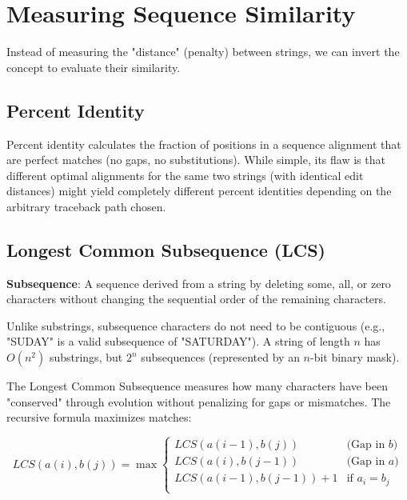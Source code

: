 \section{Measuring Sequence Similarity}

Instead of measuring the "distance" (penalty) between strings, we can invert the concept to evaluate their similarity.

\subsection{Percent Identity}
Percent identity calculates the fraction of positions in a sequence alignment that are perfect matches (no gaps, no substitutions).
While simple, its flaw is that different optimal alignments for the same two strings (with identical edit distances) might yield completely different percent identities depending on the arbitrary traceback path chosen.

\subsection{Longest Common Subsequence (LCS)}

\begin{important}
    \textbf{Subsequence}: A sequence derived from a string by deleting some, all, or zero characters without changing the sequential order of the remaining characters.
\end{important}

Unlike substrings, subsequence characters do not need to be contiguous (e.g., "SUDAY" is a valid subsequence of "SATURDAY"). A string of length $n$ has $O(n^2)$ substrings, but $2^n$ subsequences (represented by an $n$-bit binary mask).

The Longest Common Subsequence measures how many characters have been "conserved" through evolution without penalizing for gaps or mismatches. The recursive formula maximizes matches:

\[
LCS(a(i), b(j)) = \max 
\begin{cases} 
LCS(a(i-1), b(j)) & \text{(Gap in } b \text{)} \\
LCS(a(i), b(j-1)) & \text{(Gap in } a \text{)} \\
LCS(a(i-1), b(j-1)) + 1 & \text{if } a_i = b_j \\
\end{cases}
\]


